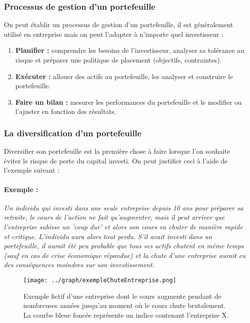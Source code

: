 \subsubsection{Processus de gestion d'un portefeuille}
On peut établir un processus de gestion d'un portefeuille, il est généralement utilisé en entreprise mais on peut l'adapter à n'importe quel investisseur :
\begin{enumerate}
 \item \textbf{Planifier :} comprendre les besoins de l'investisseur, analyser sa tolérance au risque et préparer une politique de placement (objectifs, contraintes).
 \item \textbf{Exécuter :} allouer des actifs au portefeuille, les analyser et construire le portefeuille.
 \item \textbf{Faire un bilan :} mesurer les performances du portefeuille et le modifier ou l'ajuster en fonction des résultats.
\end{enumerate}

\subsubsection{La diversification d'un portefeuille}
Diversifier son portefeuille est la première chose à faire lorsque l'on souhaite éviter le risque de perte du capital investi. On peut justifier ceci à l'aide de l'exemple suivant :

\paragraph{Exemple :} \textit{Un individu qui investi dans une seule entreprise depuis 10 ans pour préparer sa retraite, le cours de l'action ne fait qu'augmenter, mais il peut arriver que l'entreprise subisse un 'coup dur' et alors son cours va chuter de manière rapide et critique. L'individu aura alors tout perdu.
	  S'il avait investi dans un portefeuille, il aurait été peu probable que tous ses actifs chutent en même temps (sauf en cas de crise économique répandue) et la chute d'une entreprise aurait eu des conséquences moindres sur son investissement.}
	  \begin{figure}[H]
	    \center
	    \texttt{[image: ../graph/exempleChuteEntreprise.png]} \\
	    \caption{Exemple fictif d'une entreprise dont le cours augmente pendant de nombreuses années jusqu'au moment où le cours chute brutalement. La courbe bleue foncée représente un indice contenant l'entreprise X.}
	  \end{figure}
	  
